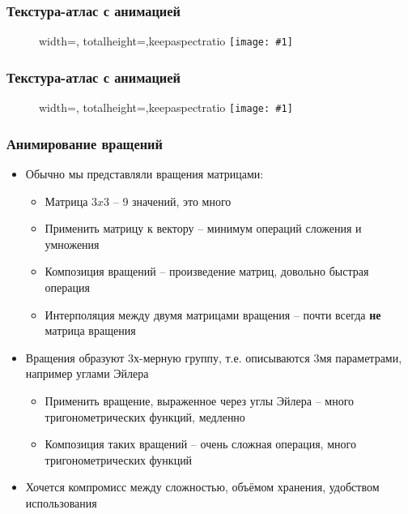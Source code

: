 \documentclass{beamer}
\newcommand{\slideimage}[1]{
  \begin{figure}
    \begin{adjustbox}{width=\textwidth, totalheight=\textheight-2\baselineskip-2\baselineskip,keepaspectratio}
      \texttt{[image: \#1]}
    \end{adjustbox}
  \end{figure}
}
\begin{document}
\begin{frame}[fragile]
\frametitle{Текстура-атлас с анимацией}
\slideimage{atlas1.jpg}
\end{frame}

\begin{frame}[fragile]
\frametitle{Текстура-атлас с анимацией}
\slideimage{atlas2.jpg}
\end{frame}

\begin{frame}[fragile]
\frametitle{Анимирование вращений}
\begin{itemize}
\item Обычно мы представляли вращения матрицами:
\begin{itemize}
\item Матрица \begin{math}3x3\end{math} -- 9 значений, это много
\pause
\item Применить матрицу к вектору -- минимум операций сложения и умножения
\pause
\item Композиция вращений -- произведение матриц, довольно быстрая операция
\pause
\item Интерполяция между двумя матрицами вращения -- почти всегда \textbf{не} матрица вращения
\end{itemize}
\pause
\item Вращения образуют 3х-мерную группу, т.е. описываются 3мя параметрами, например углами Эйлера
\pause
\begin{itemize}
\item Применить вращение, выраженное через углы Эйлера -- много тригонометрических функций, медленно
\pause
\item Композиция таких вращений -- очень сложная операция, много тригонометрических функций
\end{itemize}
\pause
\item Хочется компромисс между сложностью, объёмом хранения, удобством использования
\end{itemize}
\end{frame}
\end{document}
